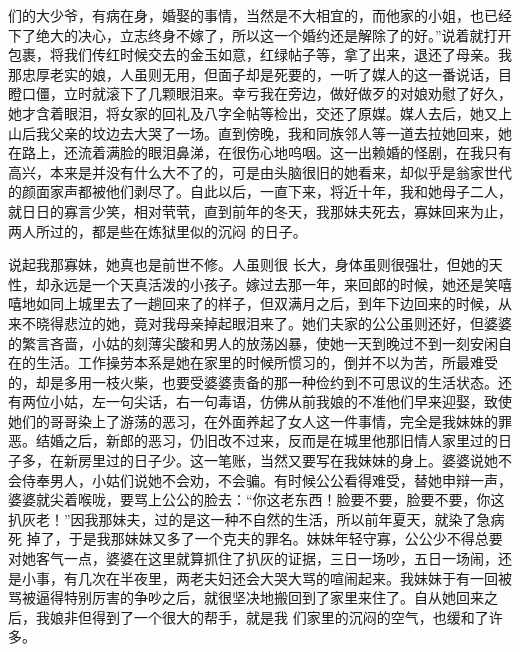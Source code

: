 \documentclass{article}
\begin{document}
\newpage
们的大少爷，有病在身，婚娶的事情，当然是不大相宜的，而他家的小姐，也已经下了绝大的决心，立志终身不嫁了，所以这一个婚约还是解除了的好。”说着就打开包裹，将我们传红时候交去的金玉如意，红绿帖子等，拿了出来，退还了母亲。我那忠厚老实的娘，人虽则无用，但面子却是死要的，一听了媒人的这一番说话，目瞪口僵，立时就滚下了几颗眼泪来。幸亏我在旁边，做好做歹的对娘劝慰了好久，她才含着眼泪，将女家的回礼及八字全帖等检出，交还了原媒。媒人去后，她又上山后我父亲的坟边去大哭了一场。直到傍晚，我和同族邻人等一道去拉她回来，她在路上，还流着满脸的眼泪鼻涕，在很伤心地呜咽。这一出赖婚的怪剧，在我只有高兴，本来是并没有什么大不了的，可是由头脑很旧的她看来，却似乎是翁家世代的颜面家声都被他们剥尽了。自此以后，一直下来，将近十年，我和她母子二人，就日日的寡言少笑，相对茕茕，直到前年的冬天，我那妹夫死去，寡妹回来为止，两人所过的，都是些在炼狱里似的沉闷
的日子。 

说起我那寡妹，她真也是前世不修。人虽则很
\newpage
长大，身体虽则很强壮，但她的天性，却永远是一个天真活泼的小孩子。嫁过去那一年，来回郎的时候，她还是笑嘻嘻地如同上城里去了一趟回来了的样子，但双满月之后，到年下边回来的时候，从来不晓得悲泣的她，竟对我母亲掉起眼泪来了。她们夫家的公公虽则还好，但婆婆的繁言吝啬，小姑的刻薄尖酸和男人的放荡凶暴，使她一天到晚过不到一刻安闲自在的生活。工作操劳本系是她在家里的时候所惯习的，倒并不以为苦，所最难受的，却是多用一枝火柴，也要受婆婆责备的那一种俭约到不可思议的生活状态。还有两位小姑，左一句尖话，右一句毒语，仿佛从前我娘的不准他们早来迎娶，致使她们的哥哥染上了游荡的恶习，在外面养起了女人这一件事情，完全是我妹妹的罪恶。结婚之后，新郎的恶习，仍旧改不过来，反而是在城里他那旧情人家里过的日子多，在新房里过的日子少。这一笔账，当然又要写在我妹妹的身上。婆婆说她不会侍奉男人，小姑们说她不会劝，不会骗。有时候公公看得难受，替她申辩一声，婆婆就尖着喉咙，要骂上公公的脸去：“你这老东西！脸要不要，脸要不要，你这扒灰老！”因我那妹夫，过的是这一种不自然的生活，所以前年夏天，就染了急病死
\newpage
掉了，于是我那妹妹又多了一个克夫的罪名。妹妹年轻守寡，公公少不得总要对她客气一点，婆婆在这里就算抓住了扒灰的证据，三日一场吵，五日一场闹，还是小事，有几次在半夜里，两老夫妇还会大哭大骂的喧闹起来。我妹妹于有一回被骂被逼得特别厉害的争吵之后，就很坚决地搬回到了家里来住了。自从她回来之后，我娘非但得到了一个很大的帮手，就是我
们家里的沉闷的空气，也缓和了许多。 
\end{document}
